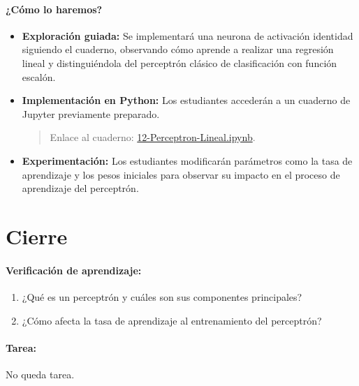 \documentclass[a4,11pt]{aleph-notas}
\begin{document}
\paragraph{¿Cómo lo haremos?}  
\begin{itemize}[leftmargin=*]
    \item \textbf{Exploración guiada:}
    Se implementará una neurona de activación identidad siguiendo el cuaderno, observando cómo aprende a realizar una regresión lineal y distinguiéndola del perceptrón clásico de clasificación con función escalón.
    
    \item \textbf{Implementación en Python:} Los estudiantes accederán a un cuaderno de Jupyter previamente preparado.
    \begin{quote}
        Enlace al cuaderno: \href{https://github.com/andres-merino/AprendizajeAutomaticoInicial-05-N0105/blob/main/2-Notebooks/12-Perceptron-Lineal.ipynb}{12-Perceptron-Lineal.ipynb}.
    \end{quote}

    \item \textbf{Experimentación:} Los estudiantes modificarán parámetros como la tasa de aprendizaje y los pesos iniciales para observar su impacto en el proceso de aprendizaje del perceptrón.
    
\end{itemize}

\section*{Cierre}

\paragraph{Verificación de aprendizaje:}
\begin{enumerate}[leftmargin=*]
    \item ¿Qué es un perceptrón y cuáles son sus componentes principales?
    
    \item ¿Cómo afecta la tasa de aprendizaje al entrenamiento del perceptrón?
\end{enumerate}

\paragraph{Tarea:}
No queda tarea.
\end{document}
